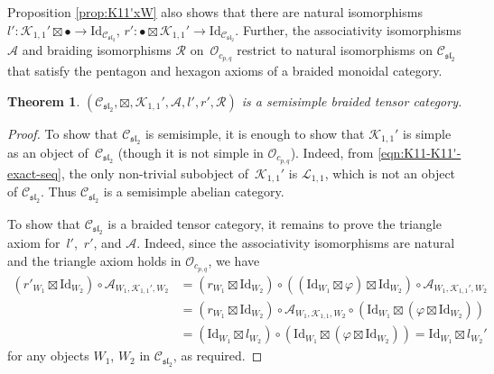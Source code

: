 \documentclass[pdftex]{sigma}
\numberwithin{equation}{section}
\newtheorem{Theorem}{Theorem}[section]
\theoremstyle{definition}
\begin{document}
Proposition \ref{prop:K11'xW} also shows that there are natural isomorphisms $l'\colon\mathcal{K}_{1,1}'\boxtimes\bullet\longrightarrow\mathrm{Id}_{\mathcal{C}_{\mathfrak{sl}_2}}$, $r'\colon\bullet\boxtimes\mathcal{K}_{1,1}'\longrightarrow\mathrm{Id}_{\mathcal{C}_{\mathfrak{sl}_2}}$. Further, the associativity isomorphisms $\mathcal{A}$ and braiding isomorphisms $\mathcal{R}$ on~$\mathcal{O}_{c_{p,q}}$ restrict to natural isomorphisms on $\mathcal{C}_{\mathfrak{sl}_2}$ that satisfy the pentagon and hexagon axioms of a braided monoidal category.





\begin{Theorem}\label{thm:Csl2-tensor}
$(\mathcal{C}_{\mathfrak{sl}_2},\boxtimes,\mathcal{K}_{1,1}',\mathcal{A},l',r',\mathcal{R})$ is a semisimple braided tensor category.
\end{Theorem}
\begin{proof}
To show that $\mathcal{C}_{\mathfrak{sl}_2}$ is semisimple, it is enough to show that $\mathcal{K}_{1,1}'$ is simple as an object of~$\mathcal{C}_{\mathfrak{sl}_2}$ (though it is not simple in $\mathcal{O}_{c_{p,q}}$). Indeed, from \eqref{eqn:K11-K11'-exact-seq}, the only non-trivial subobject of~$\mathcal{K}_{1,1}'$ is $\mathcal{L}_{1,1}$, which is not an object of $\mathcal{C}_{\mathfrak{sl}_2}$. Thus $\mathcal{C}_{\mathfrak{sl}_2}$ is a semisimple abelian category.

To show that $\mathcal{C}_{\mathfrak{sl}_2}$ is a braided tensor category, it remains to prove the triangle axiom for~$l'$,~$r'$, and $\mathcal{A}$. Indeed, since the associativity isomorphisms are natural and the triangle axiom holds in $\mathcal{O}_{c_{p,q}}$, we have
\begin{align*}
(r'_{W_1}\boxtimes\mathrm{Id}_{W_2})\circ\mathcal{A}_{W_1,\mathcal{K}_{1,1}',W_2} & = (r_{W_1}\boxtimes\mathrm{Id}_{W_2})\circ((\mathrm{Id}_{W_1}\boxtimes\varphi)\boxtimes\mathrm{Id}_{W_2})\circ\mathcal{A}_{W_1,\mathcal{K}_{1,1}',W_2}\nonumber\\
& = (r_{W_1}\boxtimes\mathrm{Id}_{W_2})\circ\mathcal{A}_{W_1,\mathcal{K}_{1,1},W_2}\circ(\mathrm{Id}_{W_1}\boxtimes(\varphi\boxtimes\mathrm{Id}_{W_2}))\nonumber\\
& =(\mathrm{Id}_{W_1}\boxtimes l_{W_2})\circ(\mathrm{Id}_{W_1}\boxtimes(\varphi\boxtimes\mathrm{Id}_{W_2})) = \mathrm{Id}_{W_1}\boxtimes l_{W_2}'
\end{align*}
for any objects $W_1$, $W_2$ in $\mathcal{C}_{\mathfrak{sl}_2}$, as required.
\end{proof}
\end{document}
